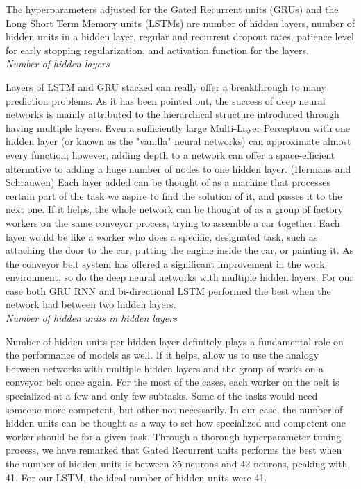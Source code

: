 \documentclass[comsoc,conference]{IEEEtran}
\begin{document}
\par The hyperparameters adjusted for the Gated Recurrent units (GRUs) and the Long Short Term Memory units (LSTMs) are number of hidden layers, number of hidden units in a hidden layer, regular and recurrent dropout rates, patience level for early stopping regularization, and activation function for the layers.
\\\emph{Number of hidden layers}
\par Layers of LSTM and GRU stacked can really offer a breakthrough to many prediction problems. As it has been pointed out, the success of deep neural networks is mainly attributed to the hierarchical structure introduced through having multiple layers. Even a sufficiently large Multi-Layer Perceptron with one hidden layer (or known as the "vanilla" neural networks) can approximate almost every function; however, adding depth to a network can offer a space-efficient alternative to adding a huge number of nodes to one hidden layer.  (Hermans and Schrauwen) Each layer added can be thought of as a machine that processes certain part of the task we aspire to find the solution of it, and passes it to the next one. If it helps, the whole network can be thought of as a group of factory workers on the same conveyor process, trying to assemble a car together. Each layer would be like a worker who does a specific, designated task, such as attaching the door to the car, putting the engine inside the car, or painting it. As the conveyor belt system has offered a significant improvement in the work environment, so do the deep neural networks with multiple hidden layers. For our case both GRU RNN and bi-directional LSTM performed the best when the network had between two hidden layers. 
\\ \emph{Number of hidden units in hidden layers}
\par Number of hidden units per hidden layer definitely plays a fundamental role on the performance of models as well. If it helps, allow us to use the analogy between networks with multiple hidden layers and the group of works on a conveyor belt once again. For the most of the cases, each worker on the belt is specialized at a few and only few subtasks. Some of the tasks would need someone more competent, but other not necessarily. In our case, the number of hidden units can be thought as a way to set how specialized and competent one worker should be for a given task. Through a thorough hyperparameter tuning process, we have remarked that Gated Recurrent units performs the best when the number of hidden units is between 35 neurons and 42 neurons, peaking with 41. For our LSTM, the ideal number of hidden units were 41.
\end{document}
